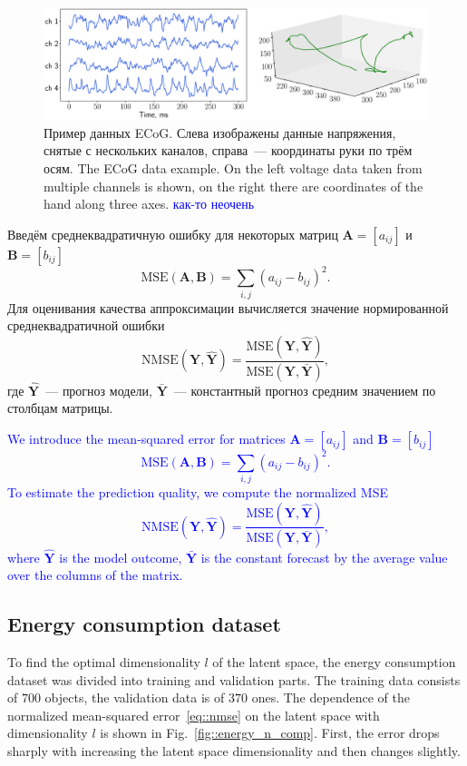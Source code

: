 \documentclass[12pt,twoside]{article}
\newcommand{\bY}{\mathbf{Y}}
\begin{document}
\begin{figure}
	\includegraphics[width=\linewidth]{figs/ecog_data.eps}
	\caption{Пример данных ECoG. Слева изображены данные напряжения, снятые с нескольких каналов, справа~--- координаты руки по трём осям. The ECoG data example. On the left voltage data taken from multiple channels is shown, on the right there are coordinates of the hand along three axes. \textcolor{blue}{как-то неочень}}
	\label{fig::ecog_data}
\end{figure}

Введём среднеквадратичную ошибку для некоторых матриц $\mathbf{A} = [a_{ij}]$ и $\mathbf{B} = [b_{ij}]$
\[
\text{MSE} (\mathbf{A}, \mathbf{B}) = \sum_{i,j} (a_{ij} - b_{ij})^2.
\]
Для оценивания качества аппроксимации вычисляется значение нормированной среднеквадратичной ошибки
\begin{equation}
\text{NMSE}(\bY,  \mathbf{\hat{Y}}) = \frac{\text{MSE} (\bY, \mathbf{\hat{Y}})}{\text{MSE} (\bY, \mathbf{\bar{Y}})},
\label{eq::nmse}
\end{equation}
где $\mathbf{\hat{Y}}$~--- прогноз модели, $\mathbf{\bar{Y}}$~--- константный прогноз средним значением по столбцам матрицы.

\textcolor{blue}{
We introduce the mean-squared error for matrices $\mathbf{A} = [a_{ij}]$ and $\mathbf{B} = [b_{ij}]$ 
\[
\text{MSE} (\mathbf{A}, \mathbf{B}) = \sum_{i,j} (a_{ij} - b_{ij})^2.
\]
To estimate the prediction quality, we compute the normalized MSE 
\begin{equation}
\text{NMSE}(\bY,  \mathbf{\hat{Y}}) = \frac{\text{MSE} (\bY, \mathbf{\hat{Y}})}{\text{MSE} (\bY, \mathbf{\bar{Y}})},
\label{eq::nmse}
\end{equation}
where $\mathbf{\hat{Y}}$ is the model outcome, $\mathbf{\bar{Y}}$ is the constant forecast by the average value over the columns of the matrix.}

\subsection{Energy consumption dataset}

To find the optimal dimensionality $l$ of the latent space, the energy consumption dataset was divided into training and validation parts. 
The training data consists of $700$ objects, the validation data is of $370$ ones. The dependence of the normalized mean-squared error~\eqref{eq::nmse} on the latent space with dimensionality $l$ is shown in Fig.~\ref{fig::energy_n_comp}. 
First, the error drops sharply with increasing the latent space dimensionality and then changes slightly.
\end{document}

